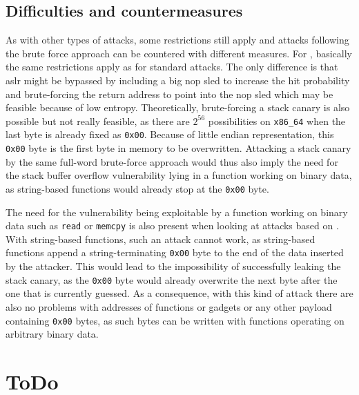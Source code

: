 \subsection{Difficulties and countermeasures}
\label{subsec:bf-countermeasures}

As with other types of attacks, some restrictions still apply and attacks following the brute force approach can be countered with different measures.
For , basically the same restrictions apply as for standard  attacks.
The only difference is that \gls{aslr} might be bypassed by including a big \acs{nop} sled to increase the hit probability and brute-forcing the return address to point into the \acs{nop} sled which may be feasible because of low entropy.
Theoretically, brute-forcing a stack canary is also possible but not really feasible, as there are $ 2^{56} $ possibilities on \texttt{x86\_64} when the last byte is already fixed as \texttt{0x00}.
Because of little endian representation, this \texttt{0x00} byte is the first byte in memory to be overwritten. Attacking a stack canary by the same full-word brute-force approach would thus also imply the need for the stack buffer overflow vulnerability lying in a function working on binary data, as string-based functions would already stop at the \texttt{0x00} byte.

The need for the vulnerability being exploitable by a function working on binary data such as \texttt{read} or \texttt{memcpy} is also present when looking at attacks based on .
With string-based functions, such an attack cannot work, as string-based functions append a string-terminating \texttt{0x00} byte to the end of the data inserted by the attacker.
This would lead to the impossibility of successfully leaking the stack canary, as the \texttt{0x00} byte would already overwrite the next byte after the one that is currently guessed.
As a consequence, with this kind of attack there are also no problems with addresses of functions or gadgets or any other payload containing \texttt{0x00} bytes, as such bytes can be written with functions operating on arbitrary binary data.

\section*{ToDo}

